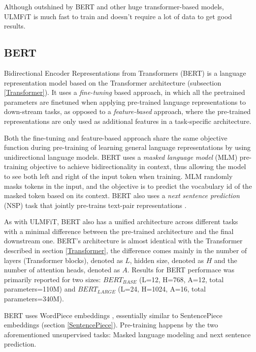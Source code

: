 Although outshined by BERT and other huge transformer-based models, ULMFiT is much fast to train and doesn't require a lot of data to get good results.



\subsection{BERT} \label{BERT}
Bidirectional Encoder Representations from Transformers (BERT) is a language representation model based on the Transformer \cite{vaswani2017} architecture (subsection \ref{Transformer}).
It uses a \textit{fine-tuning} based approach, in which all the pretrained parameters are finetuned when applying pre-trained language representations to down-stream tasks, as opposed to a \textit{feature-based} approach, where the pre-trained representations are only used as additional features in a task-specific architecture.

Both the fine-tuning and feature-based approach share the same objective function during pre-training of learning general language representations by using unidirectional language models.
BERT uses a \textit{masked language model} (MLM) pre-training objective to achieve bidirectionality in context, thus allowing the model to see both left and right of the input token when training.
MLM randomly masks tokens in the input, and the objective is to predict the vocabulary id of the masked token based on its context.
BERT also uses a \textit{next sentence prediction} (NSP) task that jointly pre-trains text-pair representations \cite{devlin2019}.

As with ULMFiT, BERT also has a unified architecture across different tasks with a minimal difference between the pre-trained architecture and the final downstream one.
BERT's architecture is almost identical with the Transformer described in section \ref{Transformer}, the difference comes mainly in the number of layers (Transformer blocks), denoted as $L$, hidden size, denoted as $H$ and the number of attention heads, denoted as $A$.
Results for BERT performace was primarily reported for two sizes: $BERT_{BASE}$ (L=12, H=768, A=12, total parameters=110M) and $BERT_{LARGE}$ (L=24, H=1024, A=16, total parameters=340M).

BERT uses WordPiece embeddings \cite{wu2016}, essentially similar to SentencePiece embeddings (section \ref{SentencePiece}).
Pre-training happens by the two aforementioned unsupervised tasks: Masked language modeling and next sentence prediction.

